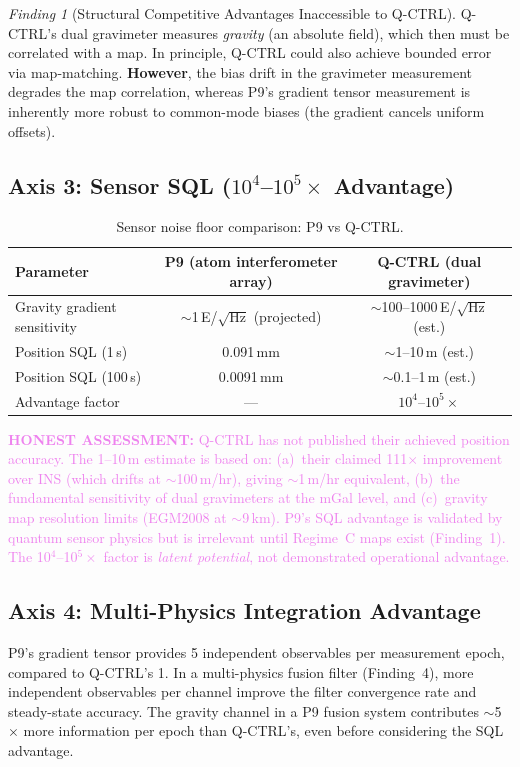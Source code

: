 \documentclass[11pt]{article}
\theoremstyle{definition}
\theoremstyle{remark}
\newtheorem{finding}[theorem]{Finding}
\newcommand{\honest}[1]{\textcolor{violet}{\textbf{HONEST ASSESSMENT:} #1}}
\begin{document}
\begin{finding}[Structural Competitive Advantages Inaccessible to Q-CTRL]
Q-CTRL's dual gravimeter measures \emph{gravity} (an absolute field),
which then must be correlated with a map. In principle, Q-CTRL
could also achieve bounded error via map-matching. \textbf{However},
the bias drift in the gravimeter measurement degrades the map
correlation, whereas P9's gradient tensor measurement is inherently
more robust to common-mode biases (the gradient cancels uniform offsets).

\subsection*{Axis 3: Sensor SQL ($10^4$--$10^5\times$ Advantage)}

\begin{table}[H]
\centering
\caption{Sensor noise floor comparison: P9 vs Q-CTRL.}
\label{tab:sensor-comparison}
\begin{tabular}{@{}lcc@{}}
\toprule
Parameter & P9 (atom interferometer array) & Q-CTRL (dual gravimeter) \\
\midrule
Gravity gradient sensitivity & $\sim$1\,E/$\sqrt{\mathrm{Hz}}$ (projected) & $\sim$100--1000\,E/$\sqrt{\mathrm{Hz}}$ (est.) \\
Position SQL (1\,s) & 0.091\,mm & $\sim$1--10\,m (est.) \\
Position SQL (100\,s) & 0.0091\,mm & $\sim$0.1--1\,m (est.) \\
Advantage factor & --- & $10^4$--$10^5\times$ \\
\bottomrule
\end{tabular}
\end{table}

\honest{Q-CTRL has not published their achieved position accuracy.
The 1--10\,m estimate is based on: (a)~their claimed 111$\times$
improvement over INS (which drifts at $\sim$100\,m/hr), giving
$\sim$1\,m/hr equivalent, (b)~the fundamental sensitivity of dual
gravimeters at the mGal level, and (c)~gravity map resolution limits
(EGM2008 at $\sim$9\,km). P9's SQL advantage is validated by
quantum sensor physics but is irrelevant until Regime~C maps exist
(Finding~1). The 10$^4$--10$^5\times$ factor is \emph{latent
potential}, not demonstrated operational advantage.}

\subsection*{Axis 4: Multi-Physics Integration Advantage}

P9's gradient tensor provides 5 independent observables per measurement
epoch, compared to Q-CTRL's 1. In a multi-physics fusion filter
(Finding~4), more independent observables per channel improve the
filter convergence rate and steady-state accuracy. The gravity channel
in a P9 fusion system contributes $\sim$5$\times$ more information
per epoch than Q-CTRL's, even before considering the SQL advantage.

\end{finding}
\end{document}
